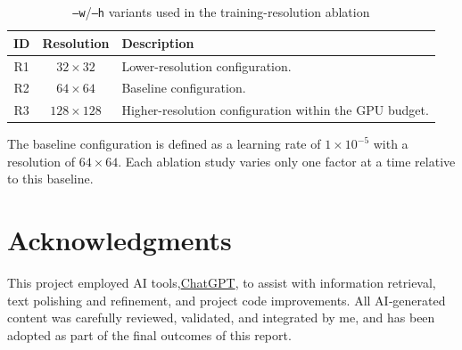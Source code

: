 \documentclass[sigconf, final, screen]{acmart}
\begin{document}
\begin{table}[h]
\caption{\texttt{--w}/\texttt{--h} variants used in the training-resolution ablation}
\label{tab:wh_variants}
\centering
\begin{tabularx}{\linewidth}{c c X}
\toprule
ID & Resolution & Description \\
\midrule
R1 & $32\times32$ & Lower-resolution configuration. \\
R2 & $64\times64$ & Baseline configuration. \\
R3 & $128\times128$ & Higher-resolution configuration within the GPU budget. \\
\bottomrule
\end{tabularx}
\end{table}
 
The baseline configuration is defined as a learning rate of $1\times10^{-5}$ with a resolution of $64\times64$. Each ablation study varies only one factor at a time relative to this baseline.


\section{Acknowledgments}
This project employed AI tools,\href{https://chatgpt.com}{ChatGPT}, to assist with information retrieval, text polishing and refinement, and project code improvements. All AI‑generated content was carefully reviewed, validated, and integrated by me, and has been adopted as part of the final outcomes of this report.

{\small


}
\end{document}
